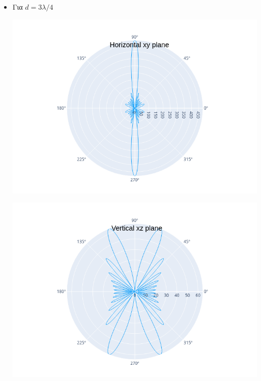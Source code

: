 \documentclass[12pt]{article}
\begin{document}
\begin{itemize}
    \item Για \(d = 3\lambda/4\)
    \begin{center}
        \includegraphics*[scale=0.6]{075xy.png}
    \end{center}
    \begin{center}
        \includegraphics*[scale=0.6]{075xz.png}
    \end{center}
\end{itemize}
\end{document}

